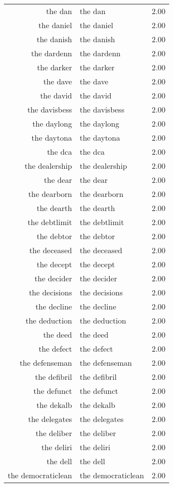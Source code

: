 \begin{table}[ht]
\begin{tabular}{rlr}
  the dan & the dan & 2.00 \\ 
  the daniel & the daniel & 2.00 \\ 
  the danish & the danish & 2.00 \\ 
  the dardenn & the dardenn & 2.00 \\ 
  the darker & the darker & 2.00 \\ 
  the dave & the dave & 2.00 \\ 
  the david & the david & 2.00 \\ 
  the davisbess & the davisbess & 2.00 \\ 
  the daylong & the daylong & 2.00 \\ 
  the daytona & the daytona & 2.00 \\ 
  the dca & the dca & 2.00 \\ 
  the dealership & the dealership & 2.00 \\ 
  the dear & the dear & 2.00 \\ 
  the dearborn & the dearborn & 2.00 \\ 
  the dearth & the dearth & 2.00 \\ 
  the debtlimit & the debtlimit & 2.00 \\ 
  the debtor & the debtor & 2.00 \\ 
  the deceased & the deceased & 2.00 \\ 
  the decept & the decept & 2.00 \\ 
  the decider & the decider & 2.00 \\ 
  the decisions & the decisions & 2.00 \\ 
  the decline & the decline & 2.00 \\ 
  the deduction & the deduction & 2.00 \\ 
  the deed & the deed & 2.00 \\ 
  the defect & the defect & 2.00 \\ 
  the defenseman & the defenseman & 2.00 \\ 
  the defibril & the defibril & 2.00 \\ 
  the defunct & the defunct & 2.00 \\ 
  the dekalb & the dekalb & 2.00 \\ 
  the delegates & the delegates & 2.00 \\ 
  the deliber & the deliber & 2.00 \\ 
  the deliri & the deliri & 2.00 \\ 
  the dell & the dell & 2.00 \\ 
  the democraticlean & the democraticlean & 2.00 \\ 

\end{tabular}
\end{table}
